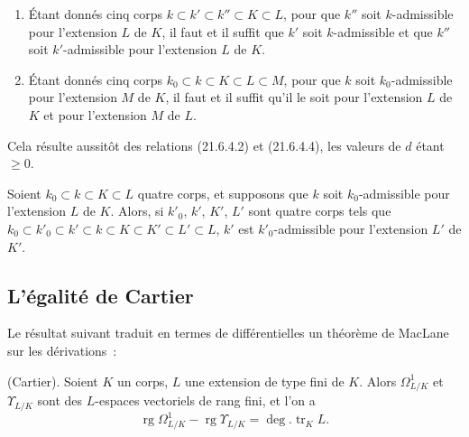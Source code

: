 \begin{corollary}[21.6.5]
\label{0.21.6.5-fr}
\begin{enumerate}
  \item[(i)] Étant donnés cinq corps $k\subset k'\subset k''\subset K\subset L$,
  pour que $k''$ soit $k$-admissible pour l'extension $L$ de $K$, il faut et
  il suffit que $k'$ soit $k$-admissible et que $k''$ soit $k'$-admissible
  pour l'extension $L$ de $K$.
  \item[(ii)] Étant donnés cinq corps
  $k_0\subset k\subset K\subset L\subset M$, pour que $k$ soit
  $k_0$-admissible pour l'extension $M$ de $K$, il faut et il suffit qu'il le
  soit pour l'extension $L$ de $K$ et pour l'extension $M$ de $L$.
\end{enumerate}

Cela résulte aussitôt des relations (21.6.4.2) et (21.6.4.4), les valeurs de
$d$ étant $\geqslant0$.
\end{corollary}

\begin{corollary}[21.6.6]
\label{0.21.6.6-fr}
Soient $k_0\subset k\subset K\subset L$ quatre corps, et supposons que $k$
soit $k_0$-admissible pour l'extension $L$ de $K$. Alors, si $k'_0$, $k'$,
$K'$, $L'$ sont quatre corps tels que
$k_0\subset k'_0\subset k'\subset k\subset K\subset K'\subset L'\subset L$,
$k'$ est $k'_0$-admissible pour l'extension $L'$ de $K'$.
\end{corollary}

\subsection{L'égalité de Cartier}
\label{subsection:0.21.7-fr}

Le résultat suivant traduit en termes de différentielles un théorème de
MacLane sur les dérivations~:

\begin{theorem}[21.7.1]
\label{0.21.7.1-fr}
\textnormal{(Cartier).}
Soient $K$ un corps, $L$ une extension de type fini de $K$. Alors
$\Omega^1_{L/K}$ et $\Upsilon_{L/K}$ sont des $L$-espaces vectoriels de rang
fini, et l'on a
\begin{equation}
\tag{21.7.1.1}
\label{0.21.7.1.1-fr}
\operatorname{rg}\Omega^1_{L/K}-\operatorname{rg}\Upsilon_{L/K}
=\deg.\operatorname{tr}_K L.
\end{equation}
\end{theorem}

